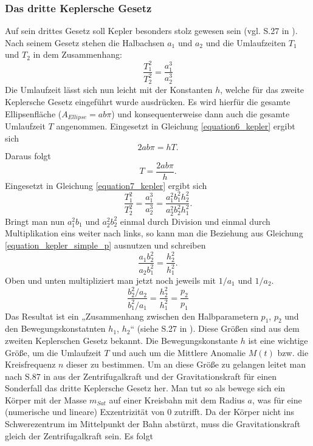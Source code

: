 \subsubsection{Das dritte Keplersche Gesetz}
Auf sein drittes Gesetz soll Kepler besonders stolz gewesen sein (vgl. S.27 in \cite{Raumflugm}). Nach seinem Gesetz stehen die Halbachsen \ensuremath{a_1} und \ensuremath{a_2} und die Umlaufzeiten \ensuremath{T_1} und \ensuremath{T_2} in dem Zusammenhang:
\begin{equation}
	\frac{T_1^2}{T_2^2}=\frac{a_1^3}{a_2^3}
	\label{equation7_kepler}
\end{equation} 
Die Umlaufzeit lässt sich nun leicht mit der Konstanten \ensuremath{h}, welche für das zweite Keplersche Gesetz eingeführt wurde ausdrücken. Es wird hierfür die gesamte Ellipsenfläche (\ensuremath{A_{Ellipse}=ab\pi}) und konsequenterweise dann auch die gesamte Umlaufzeit \ensuremath{T} angenommen. Eingesetzt in Gleichung \ref{equation6_kepler} ergibt sich
\begin{equation}
	2ab\pi=hT.
\end{equation} 
Daraus folgt
\begin{equation}
	T=\frac{2ab\pi}{h}.
	\label{equation8_kepler}
\end{equation}
Eingesetzt in Gleichung \ref{equation7_kepler} ergibt sich 
\begin{equation}
		\frac{T_1^2}{T_2^2}=\frac{a_1^3}{a_2^3}=\frac{a_1^2b_1^2h_2^2}{a_2^2b_2^2h_1^2}.
\end{equation}
Bringt man nun \ensuremath{a_1^2b_1} und \ensuremath{a_2^2b_2^2} einmal durch Division und einmal durch Multiplikation eins weiter nach links, so kann man die Beziehung aus Gleichung \ref{equation_kepler_simple_p} ausnutzen und schreiben
\begin{equation}
\frac{a_1b_2^2}{a_2b_1^2}=\frac{h_2^2}{h_1^2}.
\end{equation}
Oben und unten multipliziert man jetzt noch jeweils mit \ensuremath{1/a_1} und \ensuremath{1/a_2}.
\begin{equation}
\frac{b_2^2/a_2}{b_1^2/a_1}=\frac{h_2^2}{h_1^2}=\frac{p_2}{p_1}
\end{equation}
Das Resultat ist ein „Zusammenhang zwischen den Halbparametern \ensuremath{p_1}, \ensuremath{p_2} und den Bewegungskonstatnten \ensuremath{h_1}, \ensuremath{h_2}“ (siehe S.27 in \cite{Raumflugm}). Diese Größen sind aus dem zweiten Keplerschen Gesetz bekannt. 
\newpar
Die Bewegungskonstante \ensuremath{h} ist eine wichtige Größe, um die Umlaufzeit \ensuremath{T} und auch um die Mittlere Anomalie \ensuremath{M(t)} bzw. die Kreisfrequenz \ensuremath{n} dieser zu bestimmen. Um an diese Größe zu gelangen leitet man nach S.87 in \cite{HandRaum} aus der Zentrifugalkraft und der Gravitationskraft für einen Sonderfall das dritte Keplersche Gesetz her. Man tut so als bewege sich ein Körper mit der Masse \ensuremath{m_{Sat}} auf einer Kreisbahn mit dem Radius \ensuremath{a}, was für eine (numerische und lineare) Exzentrizität von 0 zutrifft. Da der Körper nicht ins Schwerezentrum im Mittelpunkt der Bahn abstürzt, muss die Gravitationskraft gleich der Zentrifugalkraft sein. Es folgt
